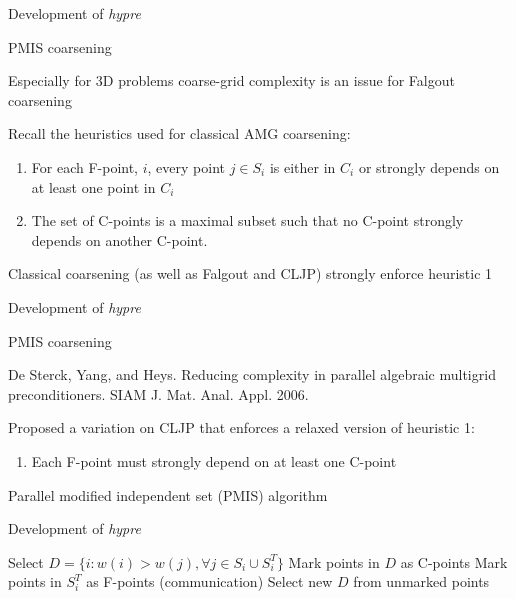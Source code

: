 \documentclass[18pt,xcolor=table]{beamer}
\begin{document}
\begin{frame}{Development of \emph{hypre}}
\begin{block}{PMIS coarsening}
\bit
\item Especially for 3D problems coarse-grid complexity is an issue for Falgout coarsening
\item Recall the heuristics used for classical AMG coarsening:
\begin{enumerate}
\item For each F-point, $i$, every point $j\in S_i$ is either in $C_i$ or strongly depends on at least one point in $C_i$
\item The set of C-points is a maximal subset such that no C-point strongly depends on another C-point.
\end{enumerate}
\item Classical coarsening (as well as Falgout and CLJP) strongly enforce heuristic 1
\item 
\eit
\end{block}
\end{frame}

\begin{frame}{Development of \emph{hypre}}
\begin{block}{PMIS coarsening}
\bit
\item De Sterck, Yang, and Heys. Reducing complexity in parallel algebraic multigrid preconditioners. SIAM J. Mat. Anal. Appl. 2006.
\item Proposed a variation on CLJP that enforces a relaxed version of heuristic 1:
\begin{enumerate}
\item Each F-point must strongly depend on at least one C-point
\end{enumerate}
\item Parallel modified independent set (PMIS) algorithm
\eit
\end{block}
\end{frame}

\begin{frame}{Development of \emph{hypre}}
\begin{algorithm}[H]
\caption{CLJP coarsening}
\begin{algorithmic}
\State Select $D = \{i : w(i)>w(j) , \forall j\in S_i\cup S_i^T\}$
\State Mark points in $D$ as C-points
   \State Mark points in $S_i^T$ as F-points (communication)
\EndFor
\State Select new $D$ from unmarked points
\EndWhile
\end{algorithmic}
\end{algorithm}
\end{frame}
\end{document}
